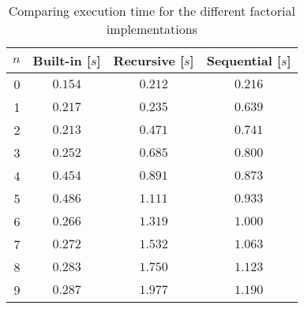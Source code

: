 \begin{table}[htp]
	\begin{center}
	\caption{Comparing execution time for
the different factorial implementations}
	\label{tab:facT}
		\begin{tabular}{rccc}
		\toprule
			{$n$} & {Built-in [$s$]} & {Recursive [$s$]} & {Sequential [$s$]}\\
			\midrule
			{0} & $0.154$ & $0.212$ & $0.216$\\
			{1} & $0.217$ & $0.235$ & $0.639$\\
			{2} & $0.213$ & $0.471$ & $0.741$\\
			{3} & $0.252$ & $0.685$ & $0.800$\\
			{4} & $0.454$ & $0.891$ & $0.873$\\
			{5} & $0.486$ & $1.111$ & $0.933$\\
			{6} & $0.266$ & $1.319$ & $1.000$\\
			{7} & $0.272$ & $1.532$ & $1.063$\\
			{8} & $0.283$ & $1.750$ & $1.123$\\
			{9} & $0.287$ & $1.977$ & $1.190$\\
		\bottomrule
		\end{tabular}
	\end{center}
\end{table}